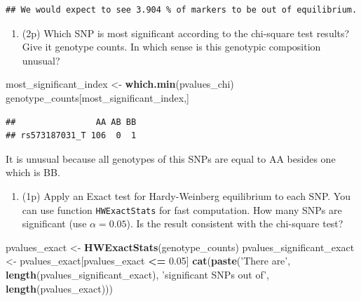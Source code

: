 \documentclass[
]{article}
\newenvironment{Shaded}{\begin{snugshade}}{\end{snugshade}}
\newcommand{\FloatTok}[1]{\textcolor[rgb]{0.00,0.00,0.81}{#1}}
\newcommand{\KeywordTok}[1]{\textcolor[rgb]{0.13,0.29,0.53}{\textbf{#1}}}
\newcommand{\NormalTok}[1]{#1}
\newcommand{\OperatorTok}[1]{\textcolor[rgb]{0.81,0.36,0.00}{\textbf{#1}}}
\newcommand{\StringTok}[1]{\textcolor[rgb]{0.31,0.60,0.02}{#1}}
\providecommand{\tightlist}{%
  \setlength{\itemsep}{0pt}\setlength{\parskip}{0pt}}
\begin{document}
\begin{verbatim}
## We would expect to see 3.904 % of markers to be out of equilibrium.
\end{verbatim}

\begin{enumerate}
\def\labelenumi{\arabic{enumi}.}
\setcounter{enumi}{6}
\tightlist
\item
  (2p) Which SNP is most significant according to the chi-square test
  results? Give it genotype counts. In which sense is this genotypic
  composition unusual?
\end{enumerate}

\begin{Shaded}
\begin{Highlighting}[]
\NormalTok{most_significant_index <-}\StringTok{ }\KeywordTok{which.min}\NormalTok{(pvalues_chi)}
\NormalTok{genotype_counts[most_significant_index,]}
\end{Highlighting}
\end{Shaded}

\begin{verbatim}
##                AA AB BB
## rs573187031_T 106  0  1
\end{verbatim}

It is unusual because all genotypes of this SNPs are equal to AA besides
one which is BB.

\begin{enumerate}
\def\labelenumi{\arabic{enumi}.}
\setcounter{enumi}{7}
\tightlist
\item
  (1p) Apply an Exact test for Hardy-Weinberg equilibrium to each SNP.
  You can use function \texttt{HWExactStats} for fast computation. How
  many SNPs are significant (use \(\alpha = 0.05\)). Is the result
  consistent with the chi-square test?
\end{enumerate}

\begin{Shaded}
\begin{Highlighting}[]
\NormalTok{pvalues_exact <-}\StringTok{ }\KeywordTok{HWExactStats}\NormalTok{(genotype_counts)}
\NormalTok{pvalues_significant_exact <-}\StringTok{ }\NormalTok{pvalues_exact[pvalues_exact }\OperatorTok{<=}\StringTok{ }\FloatTok{0.05}\NormalTok{]}
\KeywordTok{cat}\NormalTok{(}\KeywordTok{paste}\NormalTok{(}\StringTok{'There are'}\NormalTok{, }\KeywordTok{length}\NormalTok{(pvalues_significant_exact), }\StringTok{'significant SNPs out of'}\NormalTok{, }\KeywordTok{length}\NormalTok{(pvalues_exact)))}
\end{Highlighting}
\end{Shaded}
\end{document}

